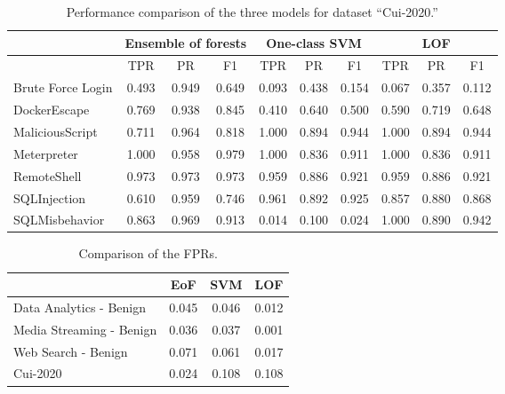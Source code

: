 \begin{table}
\setlength{\tabcolsep}{6pt}
    \centering
    \caption{Performance comparison of the three models for dataset ``Cui-2020.''}\label{tab:tfprsecond}
    \begin{tabular}{ lccccccccc}

        \toprule
                &  \multicolumn{3}{c}{Ensemble of forests} & \multicolumn{3}{c}{One-class SVM} & \multicolumn{3}{c}{LOF}\\
        \midrule
                &  TPR & PR & F1 &  TPR & PR& F1&  TPR & PR& F1 \\
        \midrule
Brute Force Login	&	0.493	&	0.949	&	0.649	&	0.093	&	0.438	&	0.154	&	0.067	&	0.357	&	0.112	\\
DockerEscape	&	0.769	&	0.938	&	0.845	&	0.410	&	0.640	&	0.500	&	0.590	&	0.719	&	0.648	\\
MaliciousScript	&	0.711	&	0.964	&	0.818	&	1.000	&	0.894	&	0.944	&	1.000	&	0.894	&	0.944	\\
Meterpreter	&	1.000	&	0.958	&	0.979	&	1.000	&	0.836	&	0.911	&	1.000	&	0.836	&	0.911	\\
RemoteShell	&	0.973	&	0.973	&	0.973	&	0.959	&	0.886	&	0.921	&	0.959	&	0.886	&	0.921	\\
SQLInjection	&	0.610	&	0.959	&	0.746	&	0.961	&	0.892	&	0.925	&	0.857	&	0.880	&	0.868	\\
SQLMisbehavior	&	0.863	&	0.969	&	0.913	&	0.014	&	0.100	&	0.024	&	1.000	&	0.890	&	0.942	\\
        \bottomrule
    \end{tabular}
\end{table}



\begin{table}
\setlength{\tabcolsep}{6pt}
    \centering
    \caption{Comparison of the FPRs.}\label{tab:fprates}
    \begin{tabular}{ lccc}
        \toprule
                &  EoF & SVM & LOF\\
        \midrule
Data Analytics - Benign	&	0.045	&	0.046	&	0.012	\\												
Media Streaming - Benign	&	0.036	&	0.037	&	0.001	\\												
Web Search  - Benign	&	0.071	&	0.061	&	0.017	\\												
\midrule																			
Cui-2020	&	0.024	&	0.108	&	0.108	\\												


        \bottomrule
    \end{tabular}
\end{table}


